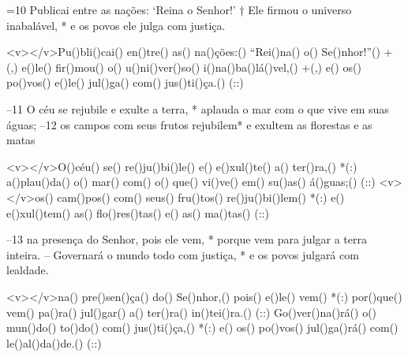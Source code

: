 =10 Publicai entre as nações: ‘Reina o Senhor!’ †
Ele firmou o universo inabalável, *
e os povos ele julga com justiça.

<v></v>Pu()bli()cai() en()tre() as() na()ções:() ``Rei()na() o() Se()nhor!''() +(,)
e()le() fir()mou() o() u()ni()ver()so() i()na()ba()lá()vel,() +(,)
e() os() po()vos() e()le() jul()ga() com() jus()ti()ça.() (::)

–11 O céu se rejubile e exulte a terra, *
aplauda o mar com o que vive em suas águas;
–12 os campos com seus frutos rejubilem*
e exultem as florestas e as matas

<v></v>O()céu() se() re()ju()bi()le() e() e()xul()te() a() ter()ra,() *(:)
a()plau()da() o() mar() com() o() que() vi()ve() em() su()as() á()guas;() (::)
<v></v>os() cam()pos() com() seus() fru()tos() re()ju()bi()lem() *(:)
e() e()xul()tem() as() flo()res()tas() e() as() ma()tas() (::)

–13 na presença do Senhor, pois ele vem, *
porque vem para julgar a terra inteira.
– Governará o mundo todo com justiça, *
e os povos julgará com lealdade.

<v></v>na() pre()sen()ça() do() Se()nhor,() pois() e()le() vem() *(:)
por()que() vem() pa()ra() jul()gar() a() ter()ra() in()tei()ra.() (::)
Go()ver()na()rá() o() mun()do() to()do() com() jus()ti()ça,() *(:)
e() os() po()vos() jul()ga()rá() com() le()al()da()de.() (::)